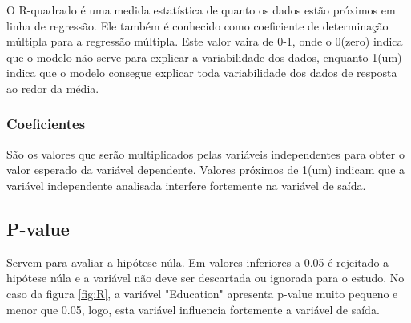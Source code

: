 O R-quadrado é uma medida estatística de quanto os dados estão próximos em linha de regressão. Ele também é conhecido como coeficiente de determinação múltipla para a regressão múltipla. Este valor vaira de 0-1, onde o 0(zero) indica que o modelo não serve para explicar a variabilidade dos dados, enquanto 1(um) indica que o modelo consegue explicar toda variabilidade dos dados de resposta ao redor da média\cite{5}. 

\subsubsection*{Coeficientes}

São os valores que serão multiplicados pelas variáveis independentes para obter o valor esperado da variável dependente. Valores próximos de 1(um) indicam que a variável independente analisada interfere fortemente na variável de saída\cite{5}. 

\subsection*{P-value}

Servem para avaliar a hipótese núla. Em valores inferiores a 0.05 é rejeitado a hipótese núla e a variável não deve ser descartada ou ignorada para o estudo. No caso da figura \ref*{fig:R}, a variável "Education" apresenta p-value muito pequeno e menor que 0.05, logo, esta variável influencia fortemente a variável de saída\cite{5}.






